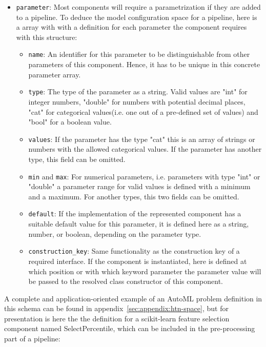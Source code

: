\begin{itemize}
\begin{itemize}[label=\textbullet]
\begin{itemize}[label=\textbullet]
            \end{itemize}
            \item \texttt{parameter}: Most components will require a parametrization if they are added to a pipeline. To deduce the model configuration space for a pipeline, here is a array with with a definition for each parameter the component requires with this structure:
            \begin{itemize}[label=\textbullet]
                \item \texttt{name}: An identifier for this parameter to be distinguishable from other parameters of this component. Hence, it has to be unique in this concrete parameter array.
                \item \texttt{type}: The type of the parameter as a string. Valid values are "int" for integer numbers, "double" for numbers with potential decimal places, "cat" for categorical values(i.e. one out of a pre-defined set of values) and "bool" for a boolean value.
                \item \texttt{values}: If the parameter has the type "cat" this is an array of strings or numbers with the allowed categorical values. If the parameter has another type, this field can be omitted.
                \item \texttt{min} and \texttt{max}: For numerical parameters, i.e. parameters with type "int" or "double" a parameter range for valid values is defined with a minimum and a maximum. For another types, this two fields can be omitted.
                \item \texttt{default}: If the implementation of the represented component has a suitable default value for this parameter, it is defined here as a string, number, or boolean, depending on the parameter type.
                \item \texttt{construction\_key}: Same functionality as the construction key of a required interface. If the component is instantiated, here is defined at which position or with which keyword parameter the parameter value will be passed to the resolved class constructor of this component.
            \end{itemize}
        \end{itemize}
\end{itemize}
A complete and application-oriented example of an AutoML problem definition in this schema can be found in appendix~\ref{sec:appendix:htn-space}, but for presentation is here the the definition for a scikit-learn feature selection component named SelectPercentile, which can be included in the pre-processing part of a pipeline:
